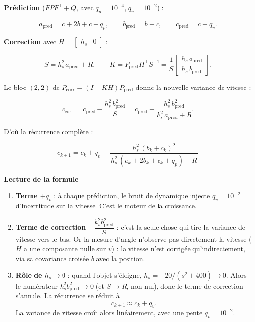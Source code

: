 \documentclass[11pt]{article}
\theoremstyle{remark}
\theoremstyle{definition}
\begin{document}
\textbf{Pr\'ediction} ($F P F^\top + Q$, avec $q_p = 10^{-4}$, $q_v = 10^{-2}$) :

\begin{equation}
a_{\text{pred}} = a + 2b + c + q_p,
\qquad
b_{\text{pred}} = b + c,
\qquad
c_{\text{pred}} = c + q_v .
\end{equation}

\textbf{Correction} avec $H = \begin{bmatrix} h_s & 0 \end{bmatrix}$ :

\begin{equation}
S = h_s^2\, a_{\text{pred}} + R,
\qquad
K = P_{\text{pred}} H^\top S^{-1}
= \frac{1}{S}\begin{bmatrix} h_s\,a_{\text{pred}} \\ h_s\,b_{\text{pred}} \end{bmatrix}.
\end{equation}

Le bloc $(2,2)$ de $P_{\text{corr}} = (I - KH) P_{\text{pred}}$ donne la nouvelle variance de
vitesse :

\begin{equation}
c_{\text{corr}} = c_{\text{pred}} - \frac{h_s^2\, b_{\text{pred}}^2}{S}
= c_{\text{pred}} - \frac{h_s^2\, b_{\text{pred}}^2}{h_s^2\, a_{\text{pred}} + R}.
\end{equation}

D'o\`u la r\'ecurrence compl\`ete :

\begin{equation}
\boxed{\,c_{k+1} = c_k + q_v - \frac{h_s^2\,(b_k + c_k)^2}{\,h_s^2\,(a_k + 2b_k + c_k + q_p) + R\,}\,}
\label{eq:ekf-recurrence}
\end{equation}

\textbf{Lecture de la formule}

\begin{enumerate}
\item \textbf{Terme $+q_v$} : \`a chaque pr\'ediction, le bruit de dynamique injecte
  $q_v = 10^{-2}$ d'incertitude sur la vitesse. C'est le moteur de la croissance.

\item \textbf{Terme de correction $-\dfrac{h_s^2 b_{\text{pred}}^2}{S}$} : c'est la seule chose
  qui tire la variance de vitesse vers le bas. Or la mesure d'angle n'observe pas directement la
  vitesse ($H$ a une composante nulle sur $v$) : la vitesse n'est corrig\'ee qu'indirectement,
  via sa covariance crois\'ee $b$ avec la position.

\item \textbf{R\^ole de $h_s \to 0$} : quand l'objet s'\'eloigne, $h_s = -20/(s^2+400) \to 0$.
  Alors le num\'erateur $h_s^2 b_{\text{pred}}^2 \to 0$ (et $S \to R$, non nul), donc le terme de
  correction s'annule. La r\'ecurrence se r\'eduit \`a
  \begin{equation}
  c_{k+1} \approx c_k + q_v .
  \end{equation}
  La variance de vitesse cro\^it alors lin\'eairement, avec une pente $q_v = 10^{-2}$.
\end{enumerate}
\end{document}
